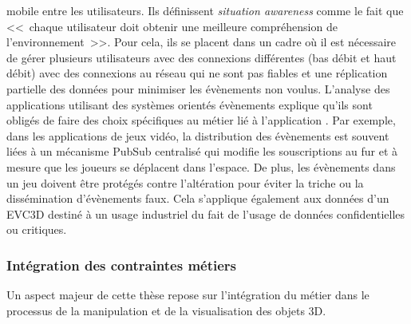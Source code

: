mobile entre les utilisateurs. Ils définissent \textit{situation awareness} comme le 
fait que <<~chaque utilisateur doit obtenir une meilleure compréhension de 
l'environnement~>>. Pour cela, ils se placent dans un cadre où il est nécessaire 
de gérer plusieurs utilisateurs avec des connexions différentes (bas débit et haut 
débit) avec des connexions au réseau qui ne sont pas fiables et une réplication 
partielle des données pour minimiser les évènements non voulus.
L'analyse des applications utilisant des systèmes orientés évènements explique 
qu'ils sont obligés de faire des choix spécifiques au métier lié à l'application 
\cite{Hinze2009}. Par exemple, dans les applications de jeux vidéo, la distribution 
des évènements est souvent liées à un mécanisme \gls{PubSub} centralisé qui 
modifie les souscriptions au fur et à mesure que les joueurs se déplacent dans 
l'espace. De plus, les évènements dans un jeu doivent être protégés contre 
l'altération pour éviter la triche ou la dissémination d'évènements faux. Cela 
s'applique également aux données d'un \gls{EVC3D} destiné à un usage industriel 
du fait de l'usage de données confidentielles ou critiques.

\subsubsection{Intégration des contraintes métiers}
Un aspect majeur de cette thèse repose sur l'intégration du métier dans le 
processus de la manipulation et de la visualisation des objets 3D.
